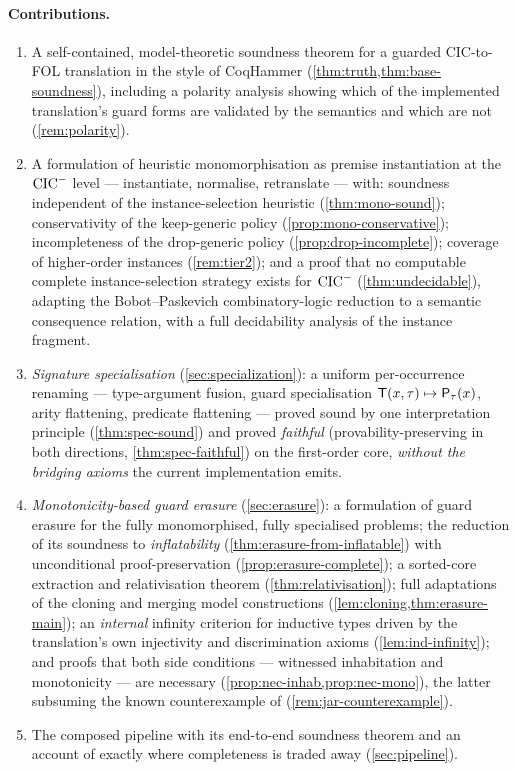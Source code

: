 \paragraph{Contributions.}
\begin{enumerate}
\item A self-contained, model-theoretic soundness theorem for a
  guarded CIC-to-FOL translation in the style of CoqHammer
  (\cref{thm:truth,thm:base-soundness}), including a polarity
  analysis showing which of the implemented translation's guard
  forms are validated by the semantics and which are not
  (\cref{rem:polarity}).
\item A formulation of heuristic monomorphisation as premise
  instantiation at the $\mathrm{CIC}^{-}$ level --- instantiate, normalise,
  retranslate --- with: soundness independent of the
  instance-selection heuristic (\cref{thm:mono-sound});
  conservativity of the keep-generic policy
  (\cref{prop:mono-conservative}); incompleteness of the
  drop-generic policy (\cref{prop:drop-incomplete}); coverage of
  higher-order instances (\cref{rem:tier2}); and a proof that no
  computable complete instance-selection strategy exists for
  $\mathrm{CIC}^{-}$ (\cref{thm:undecidable}), adapting the
  Bobot--Paskevich combinatory-logic reduction
  \cite{BobotPaskevich2011} to a semantic consequence relation,
  with a full decidability analysis of the instance fragment.
\item \emph{Signature specialisation} (\cref{sec:specialization}):
  a uniform per-occurrence renaming --- type-argument fusion, guard
  specialisation $\mathsf{T}(x, \tau) \mapsto \mathsf{P}_{\tau}(x)$, arity
  flattening, predicate flattening --- proved sound by one
  interpretation principle (\cref{thm:spec-sound}) and proved
  \emph{faithful} (provability-preserving in both directions,
  \cref{thm:spec-faithful}) on the first-order core, \emph{without
  the bridging axioms} the current implementation emits.
\item \emph{Monotonicity-based guard erasure}
  (\cref{sec:erasure}): a formulation of guard erasure for the
  fully monomorphised, fully specialised problems; the reduction of
  its soundness to \emph{inflatability}
  (\cref{thm:erasure-from-inflatable}) with unconditional
  proof-preservation (\cref{prop:erasure-complete}); a sorted-core
  extraction and relativisation theorem
  (\cref{thm:relativisation}); full adaptations of the cloning and
  merging model constructions
  (\cref{lem:cloning,thm:erasure-main}); an \emph{internal}
  infinity criterion for inductive types driven by the
  translation's own injectivity and discrimination axioms
  (\cref{lem:ind-infinity}); and proofs that both side conditions
  --- witnessed inhabitation and monotonicity --- are necessary
  (\cref{prop:nec-inhab,prop:nec-mono}), the latter subsuming the
  known counterexample of \cite[\S5.6]{CzajkaKaliszyk2018}
  (\cref{rem:jar-counterexample}).
\item The composed pipeline with its end-to-end soundness theorem
  and an account of exactly where completeness is traded away
  (\cref{sec:pipeline}).
\end{enumerate}


